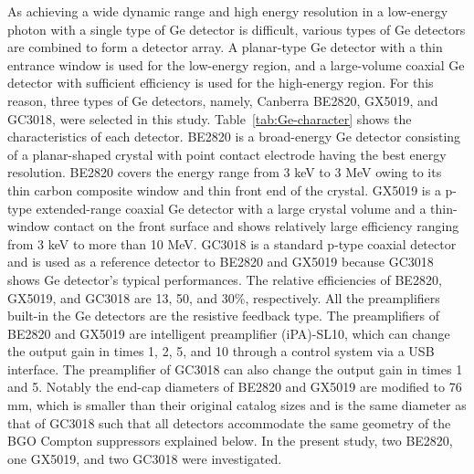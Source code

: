 As achieving a wide dynamic range and high energy resolution in a low-energy photon with a single type of Ge detector is difficult, various types of Ge detectors are combined to form a detector array.
A planar-type Ge detector with a thin entrance window is used for the low-energy region, and a large-volume coaxial Ge detector with sufficient efficiency is used for the high-energy region. %
For this reason, three types of Ge detectors, namely, Canberra BE2820, GX5019, and GC3018, were selected in this study.
Table~\ref{tab:Ge-character} shows the characteristics of each detector.
BE2820 is a broad-energy Ge detector consisting of a planar-shaped crystal with point contact electrode having the best energy resolution. %
BE2820 covers the energy range from 3 keV to 3 MeV owing to its thin carbon composite window and thin front end of the crystal. 
GX5019 is a p-type extended-range coaxial Ge detector with a large crystal volume and a thin-window contact on the front surface and shows relatively large efficiency ranging from 3 keV to more than 10 MeV.
GC3018 is a standard p-type coaxial detector %
and is used as a reference detector to BE2820 and GX5019 because GC3018 shows Ge detector's typical performances.
The relative efficiencies of BE2820, GX5019, and GC3018 are 13, 50, and 30\%, respectively. 
All the preamplifiers built-in the Ge detectors are the resistive feedback type.
The preamplifiers of BE2820 and GX5019 are intelligent preamplifier (iPA)-SL10, which can change the output gain in times 1, 2, 5, and 10 through a control system via a USB interface. 
The preamplifier of GC3018 can also change the output gain in times 1 and 5.
Notably %
the end-cap diameters of BE2820 and GX5019 are modified to 76 mm, which is smaller than their original catalog sizes and is the same diameter as that of GC3018 such that all detectors accommodate the same geometry of the BGO Compton suppressors explained below. 
In the present study, two BE2820, one GX5019, and two GC3018 were investigated. 


